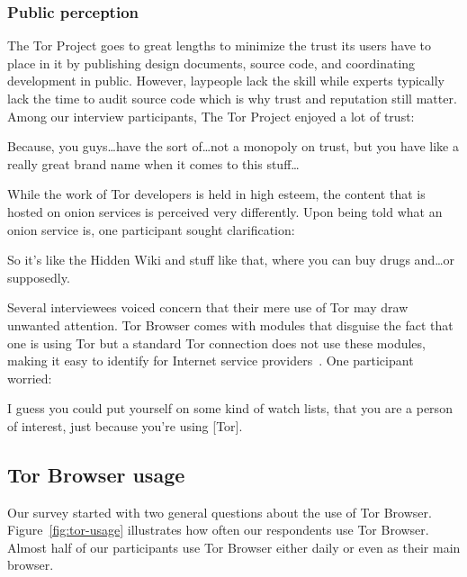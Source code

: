 \subsubsection{Public perception}

The Tor Project goes to great lengths to minimize the trust its users have to
place in it by publishing design documents, source code, and coordinating
development in public.  However, laypeople lack the skill while experts
typically lack the time to audit source code which is why trust and reputation
still matter.  Among our interview participants, The Tor Project enjoyed a lot
of trust:

\begin{displayquote}[P08]
Because, you guys\dots have the sort of\dots not a monopoly on trust, but you
have like a really great brand name when it comes to this stuff\dots
\end{displayquote}

While the work of Tor developers is held in high esteem, the content that is
hosted on onion services is perceived very differently.  Upon being told what an
onion service is, one participant sought clarification:

\begin{displayquote}[P03]
So it's like the Hidden Wiki and stuff like that, where you can buy drugs
and\dots or supposedly.
\end{displayquote}

Several interviewees voiced concern that their mere use of Tor may draw unwanted
attention.  Tor Browser comes with modules that disguise the fact that one is
using Tor but a standard Tor connection does not use these modules, making it
easy to identify for Internet service providers~\cite{pluggable}.  One
participant worried:

\begin{displayquote}[P03]
I guess you could put yourself on some kind of watch lists, that you are a
person of interest, just because you're using [Tor].
\end{displayquote}

\subsection{Tor Browser usage}

Our survey started with two general questions about the use of Tor Browser.
Figure~\ref{fig:tor-usage} illustrates how often our respondents use Tor
Browser.  Almost half of our participants use Tor Browser either daily or even
as their main browser.

